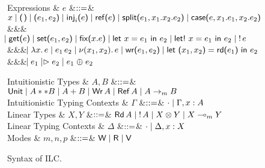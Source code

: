 \begin{figure*}
  \begin{grammar}
    Expressions
    & $e$
        &$\mathrel{::=}$&
        $\eVar{x} \bnfalt \eUnit \bnfalt \ePair{e_1}{e_2} \bnfalt \eInj{i}{e}
    \bnfalt \eRef{e} \bnfalt \eSplit{e_1}{x_1}{x_2}{e_2} \bnfalt
    \eCase{e}{x_1}{e_1}{x_2}{e_2}$
    \\ &&& $\hspace{-1.02ex}\mathrel{\mid} \text{\textsf{get}}\textsf{(}{e}\textsf{)} \mathrel{\mid} \text{\textsf{set}}\textsf{(}{e_1},{e_2}\textsf{)} \mathrel{\mid} \text{\textsf{fix}}\textsf{(}{x}.{e}\textsf{)}
    \mathrel{\mid} \text{\textsf{let}}\ {x} = {e_1}\ \text{\textsf{in}}\ {e_2} \mathrel{\mid} \text{\textsf{let!}}\ {x} = {e_1}\ \text{\textsf{in}}\ {e_2} \mathrel{\mid} {!}\,{e}$
    \\ &&& $\hspace{-1.02ex}\mathrel{\mid} \lambda{x}.\,{e} \mathrel{\mid} e_1\,e_2 \mathrel{\mid} \nu(x_1,
      x_2).\,e \mathrel{\mid} \text{\textsf{wr}}\textsf{(}{e_1},{e_2}\textsf{)} \mathrel{\mid} \text{\textsf{let}}\ {\textsf{(}{x_1},{x_2}\textsf{)}} = {\text{\textsf{rd}}\textsf{(}{e_1}\textsf{)}}\ \text{\textsf{in}}\ {{e_2}}$
    \\ &&& $\hspace{-1.02ex}\mathrel{\mid} e_1 \mathrel{|\rhd} e_2 \mathrel{\mid} e_1 \mathrel{\oplus} e_2$
  \end{grammar}
  \begin{grammar}
    Intuitionistic Types
    & $A,B$
    &$\mathrel{::=}$& $\text{\textsf{Unit}} \mathrel{\mid} {A} ** {B} \mathrel{\mid} {A} + {B} \mathrel{\mid}
    \text{\textsf{Wr}}\,A \mathrel{\mid} \text{\textsf{Ref}}\,A \mathrel{\mid} {A}\rightarrow_{\footnotesize m}{B}$
    \\
    Intuitionistic Typing Contexts
    & $\Gamma$
    &$\mathrel{::=}$& $\cdot \mathrel{\mid} \Gamma,x:A$
    \\
    Linear Types
    & $X,Y$
    &$\mathrel{::=}$& $\text{\textsf{Rd}}\,A \mathrel{\mid} {!}\,{A} \mathrel{\mid} {X}\otimes{Y} \mathrel{\mid}
    {X}\multimap_{\footnotesize m}{Y}$
    \\
    Linear Typing Contexts
    & $\Delta$
    &$\mathrel{::=}$& $\cdot \mathrel{\mid} \Delta,x:X$
    \\
    Modes & $m,n,p$ &$\mathrel{::=}$& $\textsf{W} \mathrel{\mid} \textsf{R} \mathrel{\mid} \textsf{V}$    
  \end{grammar}
  \caption{Syntax of ILC.}
  \label{fig:ilc-syntax}
\end{figure*}
